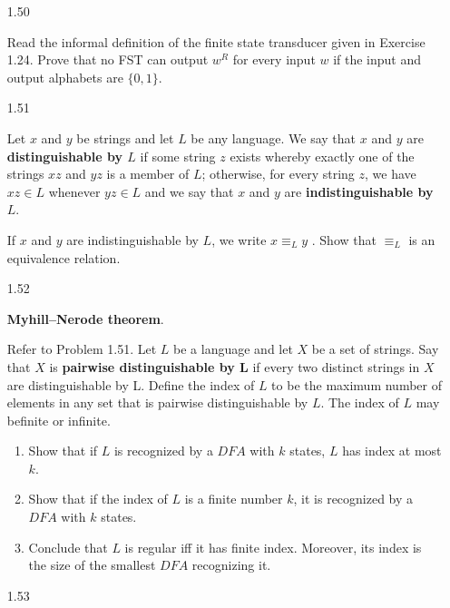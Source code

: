 \begin{enumerate}

      \item [1.50]
            
            Read the informal definition of the finite state transducer given in Exercise 1.24. Prove that no FST can output $w^R$ for every input $w$ if the input and output alphabets are $\{0,1\}$.
            
      \item [1.51]
            
            Let $x$ and $y$ be strings and let $L$ be any language. We say that $x$ and $y$ are \textbf{distinguishable by $L$} if some string $z$ exists whereby exactly one of the strings $xz$ and $yz$ is a member of $L$; otherwise, for every string $z$, we have $xz \in L$ whenever $yz \in L$ and we say that $x$ and $y$ are \textbf{indistinguishable by $L$}. 
            
            If $x$ and $y$ are indistinguishable by $L$, we write $x \equiv_{L} y$ . Show that $\equiv_{L}$ is an equivalence relation.
            
      \item [1.52]
            
            \textbf{Myhill–Nerode theorem}. 
            
            Refer to Problem 1.51. Let $L$ be a language and let $X$ be a set of strings. Say that $X$ is \textbf{pairwise distinguishable by L} if every two distinct strings in $X$ are distinguishable by L. Define the index of $L$ to be the maximum number of elements in any set that is pairwise distinguishable by $L$. The index of $L$ may befinite or infinite. 
            
            \begin{enumerate}
                  \item Show that if $L$ is recognized by a $DFA$ with $k$ states, $L$ has index at most $k$.
                  \item Show that if the index of $L$ is a finite number $k$, it is recognized by a $DFA$ with $k$ states.
                  \item Conclude that $L$ is regular iff it has finite index. Moreover, its index is the size of the smallest $DFA$ recognizing it.
            \end{enumerate}
            
      \item [1.53]
            

\end{enumerate}

